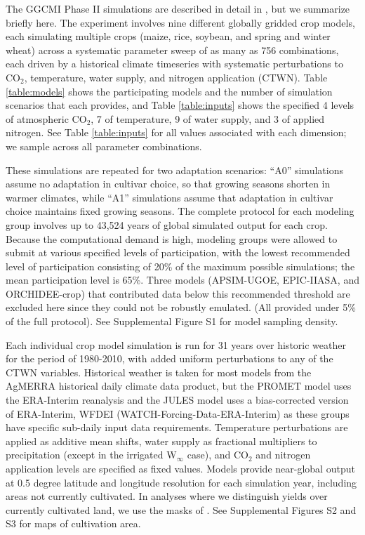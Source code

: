\documentclass[gmd, manuscript]{copernicus} %
\begin{document}
The GGCMI Phase II simulations are described in detail in \citet{Franke2019a}, but we summarize briefly here. 
The experiment involves nine different globally gridded crop models, each simulating multiple crops (maize, rice, soybean, and spring and winter wheat) across a systematic parameter sweep of as many as 756 combinations, each driven by a historical climate timeseries with systematic perturbations to CO$_2$, temperature, water supply, and nitrogen application (CTWN). 
Table \ref{table:models} shows the participating models and the number of simulation scenarios that each provides, and Table \ref{table:inputs} shows the specified 4 levels of atmospheric CO$_2$, 7 of temperature, 9 of water supply, and 3 of applied nitrogen. 
See Table \ref{table:inputs} for all values associated with each dimension; we sample across all parameter combinations.

These simulations are repeated for two adaptation scenarios: ``A0'' simulations assume no adaptation in cultivar choice, so that growing seasons shorten in warmer climates, while ``A1'' simulations assume that adaptation in cultivar choice maintains fixed growing seasons. 
The complete protocol for each modeling group involves up to 43,524 years of global simulated output for each crop. 
Because the computational demand is high, modeling groups were allowed to submit at various specified levels of participation, with the lowest recommended level of participation consisting of 20\% of the maximum possible simulations; the mean participation level is 65\%. 
Three models (APSIM-UGOE, EPIC-IIASA, and ORCHIDEE-crop) that contributed data %
below this recommended threshold are excluded here since they could not be robustly emulated. (All provided under 5\% of the full protocol). See Supplemental Figure S1 for model sampling density.

Each individual crop model simulation is run for 31 years over historic weather for the period of 1980-2010, with added uniform perturbations to any of the CTWN variables.
Historical weather is taken for most models from the AgMERRA \citep{Ruane2015} historical daily climate data product, but the PROMET model uses the ERA-Interim reanalysis \citep{dee2011era} and the JULES model uses a bias-corrected version of ERA-Interim, WFDEI (WATCH-Forcing-Data-ERA-Interim) \citep{weedon2014wfdei} as these groups have specific sub-daily input data requirements. 
Temperature perturbations are applied as additive mean shifts, water supply as fractional multipliers to precipitation (except in the irrigated W$_{\infty}$ case), and CO$_2$ and nitrogen application levels are specified as fixed values. 
Models provide near-global output at 0.5 degree latitude and longitude resolution for each simulation year, including areas not currently cultivated. 
In analyses where we distinguish yields over currently cultivated land, we use the masks of \citet{Portmann2010}. 
See Supplemental Figures S2 and S3 for maps of cultivation area.
\end{document}

